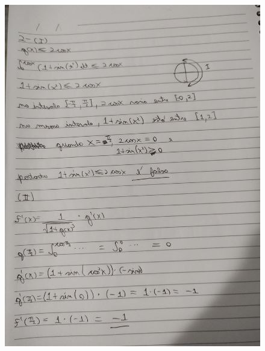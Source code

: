 \documentclass[12pt]{article}
\begin{document}
\begin{figure}[h!]
	\includegraphics[scale=0.14]{q2}
\end{figure}
\end{document}
